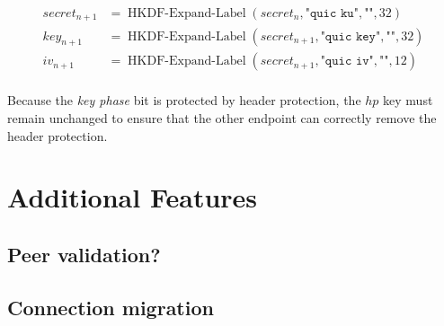 \begin{equation*}
  \begin{split}
  secret_{n+1} & = \operatorname{HKDF-Expand-Label}(secret_{n}, \texttt{"quic ku"}, \texttt{""}, 32) \\
  key_{n+1} & = \operatorname{HKDF-Expand-Label}(secret_{n+1}, \texttt{"quic key"}, \texttt{""}, 32) \\
  iv_{n+1}  & = \operatorname{HKDF-Expand-Label}(secret_{n+1}, \texttt{"quic iv"}, \texttt{""}, 12)  \\
  \end{split}
\end{equation*}

Because the \textit{key phase} bit is protected by header protection, the $hp$ key must remain
unchanged to ensure that the other endpoint can correctly remove the header protection.

\section{Additional Features}

\subsection{Peer validation?}

\subsection{Connection migration}
